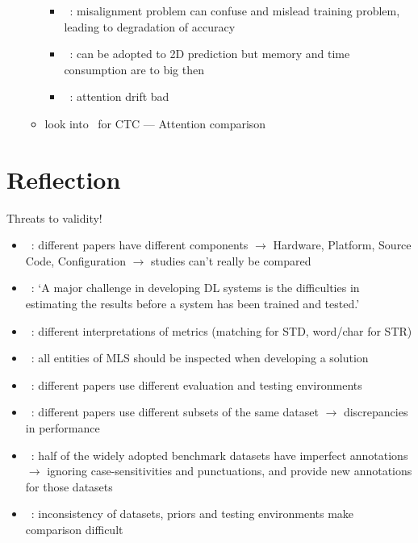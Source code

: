 \begin{itemize}
\begin{itemize}
\begin{itemize}
                    \item~\cite{xie_aggregation_2019}: misalignment problem can confuse and mislead
                        training problem, leading to degradation of accuracy
                    \item~\cite{xie_aggregation_2019}: can be adopted to 2D prediction but
                        memory and time consumption are to big then
                    \item~\cite{cheng_focusing_2017}: attention drift bad
                \end{itemize}
            \item look into~\cite{cong_comparative_2019} for CTC --- Attention comparison
        \end{itemize}
\end{itemize}

\section{Reflection}
Threats to validity!
\begin{itemize}
    \item~\cite{arpteg_software_2018}: different papers have different components
        $\rightarrow$ Hardware, Platform, Source Code, Configuration
        $\rightarrow$ studies can't really be compared
    \item~\cite{arpteg_software_2018}: `A major challenge in developing DL systems is the
        difficulties in estimating the results before a system has been trained and tested.'
    \item~\cite{long_scene_2021}: different interpretations of metrics (matching for \ac{STD},
        word/char for \ac{STR})
    \item~\cite{siebert_construction_2021,nakamichi_requirements-driven_2020}: all entities of
        \ac{MLS} should be inspected when developing a solution
    \item~\cite{baek_what_2019}: different papers use different evaluation and testing environments
    \item~\cite{baek_what_2019}: different papers use different subsets of the same dataset
        $\rightarrow$ discrepancies in performance
    \item~\cite{long_unrealtext_2020}: half of the widely adopted benchmark datasets have imperfect
        annotations $\rightarrow$ ignoring case-sensitivities and punctuations, and provide new
        annotations for those datasets
    \item~\cite{chen_text_2021}: inconsistency of datasets, priors and testing environments make
        comparison difficult
\end{itemize}

